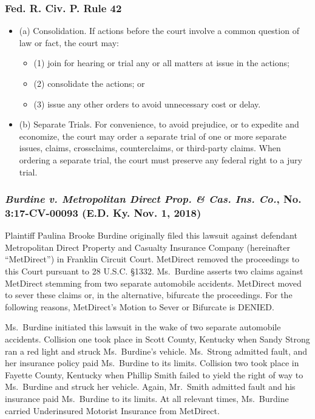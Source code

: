 \documentclass[11pt,letterpaper,twoside]{article}
\providecommand{\tightlist}{%
\setlength{\itemsep}{0em}\setlength{\parskip}{0em}\setlength{\itemindent}{0em}}
\begin{document}
\subsubsection{Fed. R. Civ. P. Rule 42}\label{fedciv_rule42}

\begin{itemize}
\tightlist
\item
  (a) Consolidation. If actions before the court involve a common
  question of law or fact, the court may:

  \begin{itemize}
  \tightlist
  \item
    (1) join for hearing or trial any or all matters at issue in the
    actions;
  \item
    (2) consolidate the actions; or
  \item
    (3) issue any other orders to avoid unnecessary cost or delay.
  \end{itemize}
\item
  (b) Separate Trials. For convenience, to avoid prejudice, or to
  expedite and economize, the court may order a separate trial of one or
  more separate issues, claims, crossclaims, counterclaims, or
  third-party claims. When ordering a separate trial, the court must
  preserve any federal right to a jury trial.
\end{itemize}

\subsubsection{\texorpdfstring{\emph{Burdine v. Metropolitan Direct
Prop. \& Cas. Ins. Co.}, No. 3:17-CV-00093 (E.D. Ky. Nov. 1,
2018)}{Burdine v. Metropolitan Direct Prop. \& Cas. Ins. Co., No. 3:17-CV-00093 (E.D. Ky. Nov. 1, 2018)}}\label{burdinemetropolitandirectprop_edky2018}

Plaintiff Paulina Brooke Burdine originally filed this lawsuit against
defendant Metropolitan Direct Property and Casualty Insurance Company
(hereinafter ``MetDirect'') in Franklin Circuit Court. MetDirect removed
the proceedings to this Court pursuant to 28 U.S.C. §1332. Ms.~Burdine
asserts two claims against MetDirect stemming from two separate
automobile accidents. MetDirect moved to sever these claims or, in the
alternative, bifurcate the proceedings. For the following reasons,
MetDirect's Motion to Sever or Bifurcate is DENIED.

Ms.~Burdine initiated this lawsuit in the wake of two separate
automobile accidents. Collision one took place in Scott County, Kentucky
when Sandy Strong ran a red light and struck Ms.~Burdine's vehicle.
Ms.~Strong admitted fault, and her insurance policy paid Ms.~Burdine to
its limits. Collision two took place in Fayette County, Kentucky when
Phillip Smith failed to yield the right of way to Ms.~Burdine and struck
her vehicle. Again, Mr.~Smith admitted fault and his insurance paid
Ms.~Burdine to its limits. At all relevant times, Ms.~Burdine carried
Underinsured Motorist Insurance from MetDirect.
\end{document}

